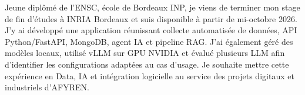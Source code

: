 
\begin{cvparagraph}
Jeune diplômé de l’ENSC, école de Bordeaux INP, je viens de terminer mon stage de fin d’études à INRIA Bordeaux et suis disponible à partir de mi-octobre 2026. J’y ai développé une application réunissant collecte automatisée de données, API Python/FastAPI, MongoDB, agent IA et pipeline RAG. J’ai également géré des modèles locaux, utilisé vLLM sur GPU NVIDIA et évalué plusieurs LLM afin d’identifier les configurations adaptées au cas d’usage. Je souhaite mettre cette expérience en Data, IA et intégration logicielle au service des projets digitaux et industriels d’AFYREN.
\end{cvparagraph}
